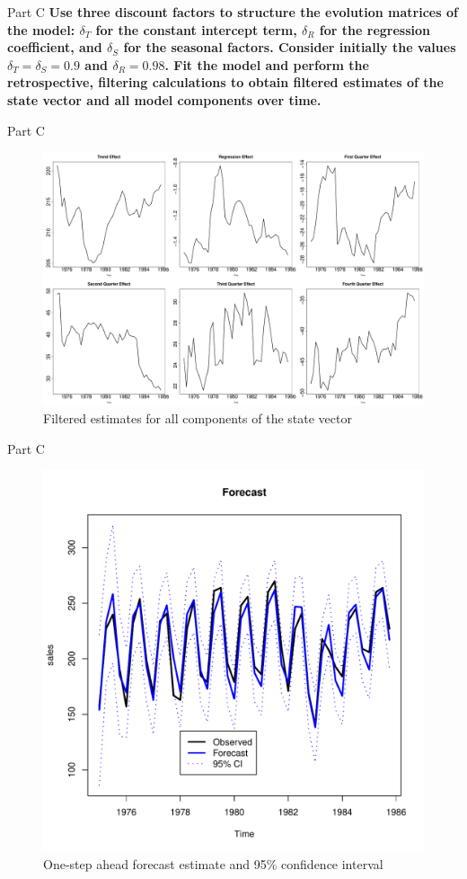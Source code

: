 \documentclass[14pt]{beamer}
\begin{document}
	\begin{frame}{Part C}
		\textbf{Use three discount factors to structure the evolution matrices of the model: $\delta_T$ for the constant intercept term, $\delta_R$ for the regression coefficient, and $\delta_S$ for the seasonal factors. Consider initially the values $\delta_T = \delta_S = 0.9$ and $\delta_R = 0.98$. Fit the model and perform the retrospective, filtering calculations to obtain filtered estimates of the state vector and all model components over time.}
	\end{frame}

	\begin{frame}{Part C}
		\begin{figure}
			\centering
			\includegraphics[width=\linewidth]{Filteredestimates}
			\caption{{\footnotesize Filtered estimates for all components of the state vector}}
			\label{fig:filteredestimates}
		\end{figure}
	\end{frame}

	\begin{frame}{Part C}
		\begin{figure}
			\centering
			\includegraphics[width=0.65\linewidth]{ForecastDist}
			\caption{{\footnotesize One-step ahead forecast estimate and 95\% confidence interval}}
			\label{fig:forecastdist}
		\end{figure}
	\end{frame}
\end{document}
